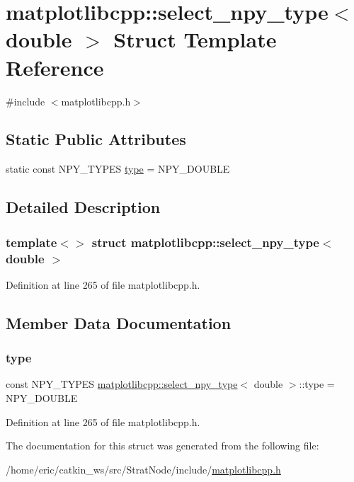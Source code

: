 \hypertarget{structmatplotlibcpp_1_1select__npy__type_3_01double_01_4}{}\section{matplotlibcpp\+::select\+\_\+npy\+\_\+type$<$ double $>$ Struct Template Reference}
\label{structmatplotlibcpp_1_1select__npy__type_3_01double_01_4}


{\ttfamily \#include $<$matplotlibcpp.\+h$>$}

\subsection*{Static Public Attributes}
\begin{DoxyCompactItemize}
\item 
static const N\+P\+Y\+\_\+\+T\+Y\+P\+ES \mbox{\hyperlink{structmatplotlibcpp_1_1select__npy__type_3_01double_01_4_a939edaf81fedb879c8c90ad13c98a709}{type}} = N\+P\+Y\+\_\+\+D\+O\+U\+B\+LE
\end{DoxyCompactItemize}


\subsection{Detailed Description}
\subsubsection*{template$<$$>$\newline
struct matplotlibcpp\+::select\+\_\+npy\+\_\+type$<$ double $>$}



Definition at line 265 of file matplotlibcpp.\+h.



\subsection{Member Data Documentation}
\mbox{\label{structmatplotlibcpp_1_1select__npy__type_3_01double_01_4_a939edaf81fedb879c8c90ad13c98a709}} 
\subsubsection{\texorpdfstring{type}{type}}
{\footnotesize\ttfamily const N\+P\+Y\+\_\+\+T\+Y\+P\+ES \mbox{\hyperlink{structmatplotlibcpp_1_1select__npy__type}{matplotlibcpp\+::select\+\_\+npy\+\_\+type}}$<$ double $>$\+::type = N\+P\+Y\+\_\+\+D\+O\+U\+B\+LE\hspace{0.3cm}{\ttfamily [static]}}



Definition at line 265 of file matplotlibcpp.\+h.



The documentation for this struct was generated from the following file\+:\begin{DoxyCompactItemize}
\item 
/home/eric/catkin\+\_\+ws/src/\+Strat\+Node/include/\mbox{\hyperlink{matplotlibcpp_8h}{matplotlibcpp.\+h}}\end{DoxyCompactItemize}
